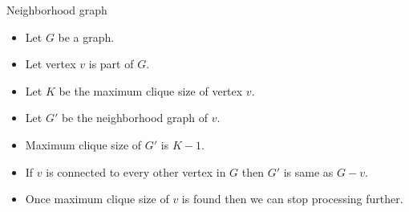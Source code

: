 \documentclass[landscape]{slides}
\begin{document}
\begin{slide}

\begin{center}
	\begin{center}
		{\large Neighborhood graph }
	\end{center}

\end{center}

	\begin{itemize}
		\setlength{\itemsep}{0pt}
		\setlength{\parskip}{0pt}
		\setlength{\parsep}{0pt}
		\item Let {$G$} be a graph.
		\item Let vertex {$v$} is part of {$G$}.
		\item Let {$K$} be the maximum clique size of vertex {$v$}.
		\item Let {$G'$} be the neighborhood graph of {$v$}.
		\item Maximum clique size of {$G'$} is {$K - 1$}.
		\item If {$v$} is connected to every other vertex in {$G$} then {$G'$} is same as {$G - v$}.
		\item Once maximum clique size of {$v$} is found then we can stop processing further.
	\end{itemize}
\end{slide}
\end{document}
